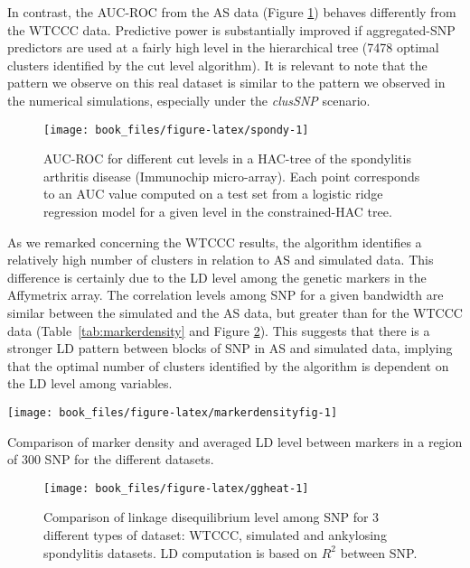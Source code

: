 \documentclass[]{book}
\begin{document}
In contrast, the AUC-ROC from the AS data (Figure \ref{fig:spondy})
behaves differently from the WTCCC data. Predictive power is
substantially improved if aggregated-SNP predictors are used at a fairly
high level in the hierarchical tree (7478 optimal clusters identified by
the cut level algorithm). It is relevant to note that the pattern we
observe on this real dataset is similar to the pattern we observed in
the numerical simulations, especially under the \emph{clusSNP} scenario.



\begin{figure}

{\centering \texttt{[image: book\_files/figure-latex/spondy-1]} 

}

\caption{AUC-ROC for different cut levels in a HAC-tree of the spondylitis arthritis disease (Immunochip micro-array). Each point corresponds to an AUC value computed on a test set from a logistic ridge regression model for a given level in the constrained-HAC tree.}\label{fig:spondy}
\end{figure}

As we remarked concerning the WTCCC results, the algorithm identifies a
relatively high number of clusters in relation to AS and simulated data.
This difference is certainly due to the LD level among the genetic
markers in the Affymetrix array. The correlation levels among SNP for a
given bandwidth are similar between the simulated and the AS data, but
greater than for the WTCCC data (Table~\ref{tab:markerdensity} and
Figure \ref{fig:ggheat}). This suggests that there is a stronger LD
pattern between blocks of SNP in AS and simulated data, implying that
the optimal number of clusters identified by the algorithm is dependent
on the LD level among variables.

\begin{center}\texttt{[image: book\_files/figure-latex/markerdensityfig-1]} \end{center}

\label{tab:markerdensity}Comparison of marker density and averaged LD level between markers in a region of 300 SNP for the different datasets.



\begin{figure}

{\centering \texttt{[image: book\_files/figure-latex/ggheat-1]} 

}

\caption{Comparison of linkage disequilibrium level among SNP for 3 different types of dataset: WTCCC, simulated and ankylosing spondylitis datasets. LD computation is based on \(R^2\) between SNP.}\label{fig:ggheat}
\end{figure}
\end{document}
